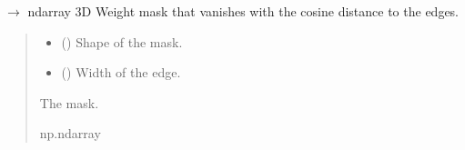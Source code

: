 \documentclass[letterpaper,10pt,english]{sphinxmanual}
\begin{document}

\begin{fulllineitems}
\label{\detokenize{source/Windowing:Windowing.make_mask_cosine_edge3d}}
\pysigstartsignatures
\pysiglinewithargsret
{}
{\sphinxparamcomma {}}
{{ $\rightarrow$ ndarray}}
\pysigstopsignatures
\sphinxAtStartPar
3D Weight mask that vanishes with the cosine distance to the edges.
\begin{quote}\begin{description}
\begin{itemize}
\item {} 
\sphinxAtStartPar
{} (\sphinxstyleliteralemphasis{\sphinxupquote{{[}}}\sphinxstyleliteralemphasis{\sphinxupquote{, }}\sphinxstyleliteralemphasis{\sphinxupquote{, }}\sphinxstyleliteralemphasis{\sphinxupquote{{]}}}) \textendash{} Shape of the mask.

\item {} 
\sphinxAtStartPar
{} () \textendash{} Width of the edge.

\end{itemize}

\sphinxAtStartPar
The mask.

\sphinxAtStartPar
np.ndarray

\end{description}\end{quote}

\end{fulllineitems}


\sphinxstepscope
\end{document}

